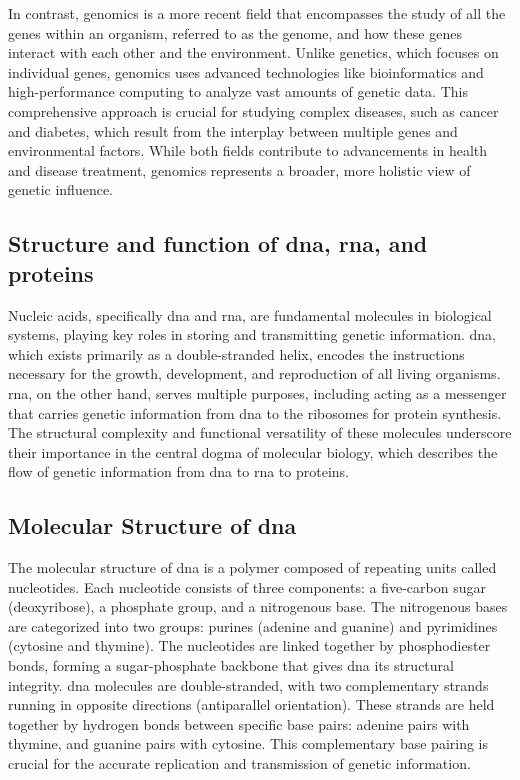 In contrast, genomics is a more recent field that encompasses the study of all the genes within an organism, referred to as the genome, and how these genes interact with each other and the environment. Unlike genetics, which focuses on individual genes, genomics uses advanced technologies like bioinformatics and high-performance computing to analyze vast amounts of genetic data. This comprehensive approach is crucial for studying complex diseases, such as cancer and diabetes, which result from the interplay between multiple genes and environmental factors. While both fields contribute to advancements in health and disease treatment, genomics represents a broader, more holistic view of genetic influence. \cite{JAX2017}

\subsection{Structure and function of \ac{dna}, \ac{rna}, and proteins}

Nucleic acids, specifically  \ac{dna} and \ac{rna}, are fundamental molecules in biological systems, playing key roles in storing and transmitting genetic information. \ac{dna}, which exists primarily as a double-stranded helix, encodes the instructions necessary for the growth, development, and reproduction of all living organisms. \ac{rna}, on the other hand, serves multiple purposes, including acting as a messenger that carries genetic information from \ac{dna} to the ribosomes for protein synthesis. The structural complexity and functional versatility of these molecules underscore their importance in the central dogma of molecular biology, which describes the flow of genetic information from \ac{dna} to \ac{rna} to proteins. \cite{Minchin2019}

\subsection{Molecular Structure of \ac{dna}}

The molecular structure of \ac{dna} is a polymer composed of repeating units called nucleotides. Each nucleotide consists of three components: a five-carbon sugar (deoxyribose), a phosphate group, and a nitrogenous base. The nitrogenous bases are categorized into two groups: purines (adenine and guanine) and pyrimidines (cytosine and thymine). The nucleotides are linked together by phosphodiester bonds, forming a sugar-phosphate backbone that gives \ac{dna} its structural integrity. \ac{dna} molecules are double-stranded, with two complementary strands running in opposite directions (antiparallel orientation). These strands are held together by hydrogen bonds between specific base pairs: adenine pairs with thymine, and guanine pairs with cytosine. This complementary base pairing is crucial for the accurate replication and transmission of genetic information. \cite{Minchin2019}

